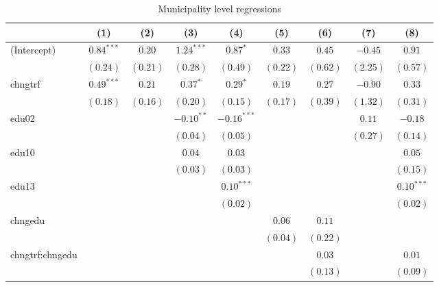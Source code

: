 
\begin{table}
\caption{Municipality level regressions}
\begin{center}
\begin{tabular}{l c c c c c c c c }
\hline
 & (1) & (2) & (3) & (4) & (5) & (6) & (7) & (8) \\
\hline
(Intercept)     & $0.84^{***}$ & $0.20$   & $1.24^{***}$ & $0.87^{*}$    & $0.33$   & $0.45$   & $-0.45$  & $0.91$       \\
                & $(0.24)$     & $(0.21)$ & $(0.28)$     & $(0.49)$      & $(0.22)$ & $(0.62)$ & $(2.25)$ & $(0.57)$     \\
chngtrf         & $0.49^{***}$ & $0.21$   & $0.37^{*}$   & $0.29^{*}$    & $0.19$   & $0.27$   & $-0.90$  & $0.33$       \\
                & $(0.18)$     & $(0.16)$ & $(0.20)$     & $(0.15)$      & $(0.17)$ & $(0.39)$ & $(1.32)$ & $(0.31)$     \\
edu02           &              &          & $-0.10^{**}$ & $-0.16^{***}$ &          &          & $0.11$   & $-0.18$      \\
                &              &          & $(0.04)$     & $(0.05)$      &          &          & $(0.27)$ & $(0.14)$     \\
edu10           &              &          & $0.04$       & $0.03$        &          &          &          & $0.05$       \\
                &              &          & $(0.03)$     & $(0.03)$      &          &          &          & $(0.15)$     \\
edu13           &              &          &              & $0.10^{***}$  &          &          &          & $0.10^{***}$ \\
                &              &          &              & $(0.02)$      &          &          &          & $(0.02)$     \\
chngedu         &              &          &              &               & $0.06$   & $0.11$   &          &              \\
                &              &          &              &               & $(0.04)$ & $(0.22)$ &          &              \\
chngtrf:chngedu &              &          &              &               &          & $0.03$   &          & $0.01$       \\
                &              &          &              &               &          & $(0.13)$ &          & $(0.09)$     \\

\end{tabular}
\end{center}
\end{table}
